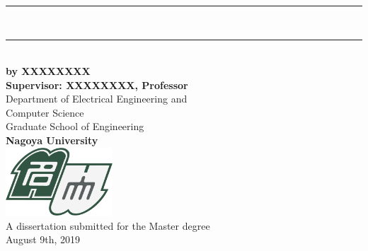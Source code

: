 \newcommand{\HRule}{\rule{\linewidth}{0.5mm}}
\begin{titlepage}
\begin{center}
\vspace{9cm}
\hspace{-0.3cm}
\fontsize{18pt}{0.7\baselineskip}\\[0.4cm]
\fontsize{18pt}{0.7\baselineskip}\\[0.4cm]
\fontsize{18pt}{0.7\baselineskip}\\[0.4cm]
\vspace{-3.7cm}
\HRule \\[1.5cm]
\vspace{2.5cm}
\HRule \\[1.5cm]
\vspace{2cm}
\large {\bfseries by XXXXXXXX }\\[1cm]
\large {\bfseries Supervisor: XXXXXXXX, Professor}\\[1cm]

\large Department of Electrical Engineering and \\[0.1cm]
\large Computer Science\\[0.3cm]
\large Graduate School of Engineering\\[0.3cm]
\large {\bfseries Nagoya University}\\[1.5cm]

\includegraphics[width=0.3\textwidth]{./01.Title/Fig/logo.pdf}\\[1cm]

\vfill
\large A dissertation submitted for the Master degree\\[0.3cm]
 {\large August 9th, 2019}

\end{center}
\end{titlepage}

